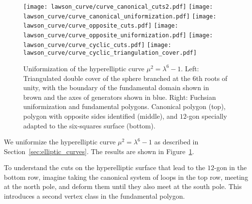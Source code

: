 \documentclass[Thesis]{subfiles}
\begin{document}

\begin{figure}
	\centering
	\resizebox{\textwidth}{!} {
	\texttt{[image: lawson\_curve/curve\_canonical\_cuts2.pdf]}
	\texttt{[image: lawson\_curve/curve\_canonical\_uniformization.pdf]}
	}
	\resizebox{\textwidth}{!} {
	\texttt{[image: lawson\_curve/curve\_opposite\_cuts.pdf]}
	\texttt{[image: lawson\_curve/curve\_opposite\_uniformization.pdf]}
	}
	\resizebox{\textwidth}{!} {
	\texttt{[image: lawson\_curve/curve\_cyclic\_cuts.pdf]}
	\texttt{[image: lawson\_curve/curve\_cyclic\_triangulation\_cover.pdf]}
	}
	\caption{Uniformization of the hyperelliptic curve
          $\mu^2=\lambda^6-1$. Left: Triangulated double cover of the
          sphere branched at the 6th roots of unity, with the boundary
          of the fundamental domain shown in brown and the axes of
          generators shown in blue. Right: Fuchsian uniformization and
          fundamental polygons. Canonical polygon (top), polygon with
          opposite sides identified (middle), and $12$-gon specially
          adapted to the six-squares surface (bottom).}
	\label{fig:lawson_curve}
\end{figure}

We uniformize the hyperelliptic curve $\mu^2=\lambda^6-1$ as described
in Section~\ref{sec:elliptic_curves}. The results are shown in Figure~\ref{fig:lawson_curve}.

To understand the cuts on the hyperelliptic surface that lead to the
$12$-gon in the bottom row, imagine taking the canonical system of
loops in the top row, meeting at the north pole,  and deform them
until they also meet at the south pole. This introduces a second
vertex class in the fundamental polygon.


\end{document}
